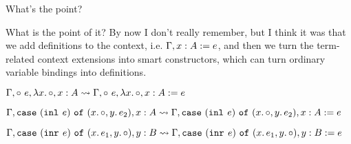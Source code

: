 \documentclass{beamer}
\begin{document}
\begin{frame}{What's the point?}

What is the point of it? By now I don't really remember, but I think it was that we add definitions to the context, i.e. $\extend{\Gamma}{x}{A}[e]$, and then we turn the term-related context extensions into smart constructors, which can turn ordinary variable bindings into definitions.

\vspace{1em}

$\extendfun{\extendappl{\Gamma}{e}}{x}{A} \leadsto \extendfun{\extendappl{\Gamma}{e}}{x}{A}[e]$

\vspace{1em}

$\extendcasel{\Gamma}{(\inl{e})}{x}{A}{y.\, e_2} \leadsto \extendcasel{\Gamma}{(\inl{e})}{x}{A}{y.\, e_2}[e]$

\vspace{1em}

$\extendcaser{\Gamma}{(\inr{e})}{x.\, e_1}{y}{B} \leadsto \extendcaser{\Gamma}{(\inr{e})}{x.\, e_1}{y}{B}[e]$

\end{frame}
\end{document}
